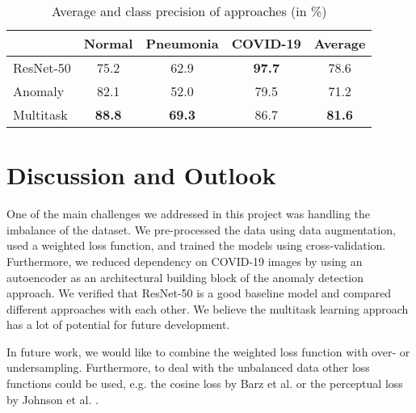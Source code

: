 \documentclass[conference]{IEEEtran}
\begin{document}
\begin{table}[]
\centering
\caption{Average and class precision of approaches (in \%)}
\begin{tabular}{|l|c|c|c|c|}
\hline
 & Normal & Pneumonia & COVID-19 & Average \\ \hline
ResNet-50 & 75.2 & 62.9 & \textbf{97.7} & 78.6 \\ \hline
Anomaly & 82.1 & 52.0 & 79.5 & 71.2 \\ \hline
Multitask & \textbf{88.8} & \textbf{69.3} & 86.7 & \textbf{81.6} \\ \hline
\end{tabular}

\label{tab:precision}
\end{table}

\label{chap5_discussion}
\section{Discussion and Outlook}

One of the main challenges we addressed in this project was handling the imbalance of the dataset. We pre-processed the data using data augmentation, used a weighted loss function, and trained the models using cross-validation. Furthermore, we reduced dependency on COVID-19 images by using an autoencoder as an architectural building block of the anomaly detection approach. We verified that ResNet-50 is a good baseline model and compared different approaches with each other. We believe the multitask learning approach has a lot of potential for future development.

In future work, we would like to combine the weighted loss function with over- or undersampling. Furthermore, to deal with the unbalanced data other loss functions could be used, e.g. the cosine loss by Barz et al. \cite{barz2020deep} or the perceptual loss by Johnson et al. \cite{johnson2016perceptual}.
\end{document}
